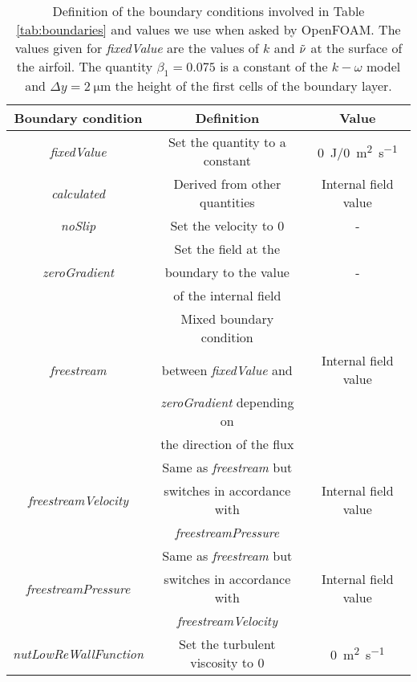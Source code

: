 \begin{subappendices}
	\begin{table}
		\caption{Definition of the boundary conditions involved in Table \ref{tab:boundaries} and values we use when asked by OpenFOAM. The values given for \emph{fixedValue} are the values of $k$ and $\Tilde{\nu}$ at the surface of the airfoil. The quantity $\beta_1 = 0.075$ is a constant of the $k-\omega$ model \cite{komega} and $\Delta y = \SI{2}{\micro\meter}$ the height of the first cells of the boundary layer.}
		\centering
		\begin{tabular}{ccc}
			\toprule
			Boundary condition & Definition & Value \\
			\midrule
			\emph{fixedValue} & Set the quantity to a constant & \SI{0}{\joule}/\SI{0}{\square\meter\per\second} \vspace{0.2cm} \\
			\emph{calculated} & Derived from other quantities & Internal field value \vspace{0.2cm} \\
			\emph{noSlip} & Set the velocity to 0 & - \vspace{0.2cm} \\
			& Set the field at the &  \\
			\emph{zeroGradient} & boundary to the value & - \\
			& of the internal field & \vspace{0.2cm} \\
			& Mixed boundary condition & \\
			\emph{freestream} & between \emph{fixedValue} and & Internal field value\\ 
			& \emph{zeroGradient} depending on & \\
			& the direction of the flux & \vspace{0.2cm} \\
			& Same as \emph{freestream} but & \\
			\emph{freestreamVelocity} & switches in accordance with & Internal field value\\ 
			& \emph{freestreamPressure} & \vspace{0.2cm} \\
			& Same as \emph{freestream} but & \\
			\emph{freestreamPressure} & switches in accordance with & Internal field value\\ 
			& \emph{freestreamVelocity} & \vspace{0.2cm} \\
			\emph{nutLowReWallFunction} & Set the turbulent viscosity to 0 & \SI{0}{\square\meter\per\second} \vspace{0.2cm} \\

\end{tabular}
\end{table}
\end{subappendices}
